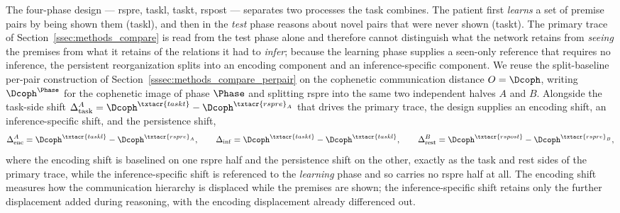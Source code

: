 The four-phase design --- \acrshort{rspre}, \acrshort{taskl}, \acrshort{taskt}, \acrshort{rspost} --- separates two processes the task combines. The patient first \emph{learns} a set of premise pairs by being shown them (\acrshort{taskl}), and then in the \emph{test} phase reasons about novel pairs that were never shown (\acrshort{taskt}). The primary trace of Section~\ref{ssec:methods_compare} is read from the test phase alone and therefore cannot distinguish what the network retains from \emph{seeing} the premises from what it retains of the relations it had to \emph{infer}; because the learning phase supplies a seen-only reference that requires no inference, the persistent reorganization splits into an encoding component and an inference-specific component. We reuse the split-baseline per-pair construction of Section~\ref{sssec:methods_compare_perpair} on the cophenetic communication distance \(O = \Dcoph\), writing \(\Dcoph^{\Phase}\) for the cophenetic image of phase \(\Phase\) and splitting \acrshort{rspre} into the same two independent halves \(A\) and \(B\). Alongside the task-side shift \(\Delta_{\rm task}^{A} = \Dcoph^{\txtacr{taskt}} - \Dcoph^{\txtacr{rspre}_{A}}\) that drives the primary trace, the design supplies an encoding shift, an inference-specific shift, and the persistence shift,
\begin{equation}
    \Delta_{\rm enc}^{A} = \Dcoph^{\txtacr{taskl}} - \Dcoph^{\txtacr{rspre}_{A}}, \qquad
    \Delta_{\rm inf} = \Dcoph^{\txtacr{taskt}} - \Dcoph^{\txtacr{taskl}}, \qquad
    \Delta_{\rm rest}^{B} = \Dcoph^{\txtacr{rspost}} - \Dcoph^{\txtacr{rspre}_{B}},
    \label{eq:methods_arc_shifts}
\end{equation}
where the encoding shift is baselined on one \acrshort{rspre} half and the persistence shift on the other, exactly as the task and rest sides of the primary trace, while the inference-specific shift is referenced to the \emph{learning} phase and so carries no \acrshort{rspre} half at all. The encoding shift measures how the communication hierarchy is displaced while the premises are shown; the inference-specific shift retains only the further displacement added during reasoning, with the encoding displacement already differenced out.

